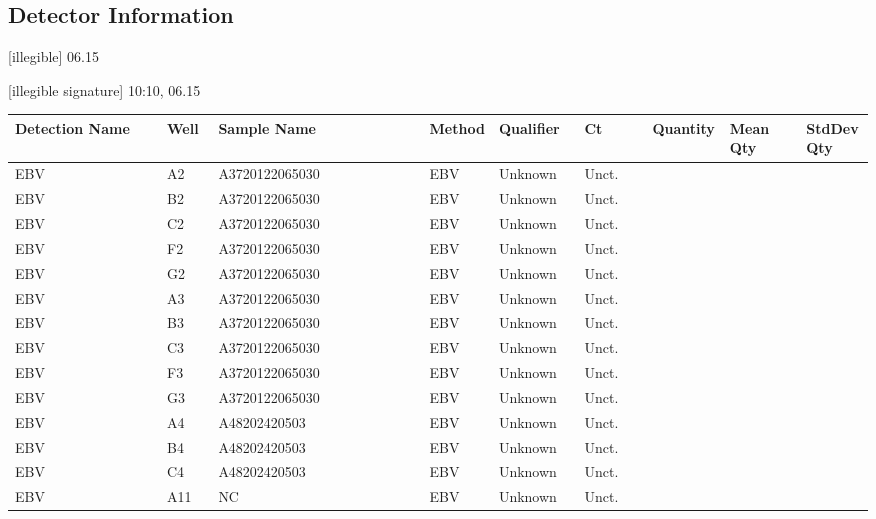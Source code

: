 \documentclass[UTF8,10pt,a4paper,fontset=fandol]{ctexart}
\newcommand{\handwritten}[1]{#1}
\begin{document}
\subsection*{Detector Information}

\handwritten{[illegible] 06.15}

\handwritten{[illegible signature] 10:10, 06.15}

\newpage

\begin{center}
\small
\begin{tabular}{p{0.18\linewidth}p{0.06\linewidth}p{0.25\linewidth}p{0.07\linewidth}p{0.10\linewidth}p{0.08\linewidth}p{0.09\linewidth}p{0.09\linewidth}p{0.09\linewidth}}
\textbf{Detection Name} &
\textbf{Well} &
\textbf{Sample Name} &
\textbf{Method} &
\textbf{Qualifier} &
\textbf{Ct} &
\textbf{Quantity} &
\textbf{Mean Qty} &
\textbf{StdDev Qty}
\\ \hline
EBV & A2  & A3720122065030 & EBV & Unknown & Unct. & & & \\
EBV & B2  & A3720122065030 & EBV & Unknown & Unct. & & & \\
EBV & C2  & A3720122065030 & EBV & Unknown & Unct. & & & \\
EBV & F2  & A3720122065030 & EBV & Unknown & Unct. & & & \\
EBV & G2  & A3720122065030 & EBV & Unknown & Unct. & & & \\
EBV & A3  & A3720122065030 & EBV & Unknown & Unct. & & & \\
EBV & B3  & A3720122065030 & EBV & Unknown & Unct. & & & \\
EBV & C3  & A3720122065030 & EBV & Unknown & Unct. & & & \\
EBV & F3  & A3720122065030 & EBV & Unknown & Unct. & & & \\
EBV & G3  & A3720122065030 & EBV & Unknown & Unct. & & & \\
EBV & A4  & A48202420503 & EBV & Unknown & Unct. & & & \\
EBV & B4  & A48202420503 & EBV & Unknown & Unct. & & & \\
EBV & C4  & A48202420503 & EBV & Unknown & Unct. & & & \\
EBV & A11 & NC & EBV & Unknown & Unct. & & & \\

\end{tabular}
\end{center}
\end{document}
